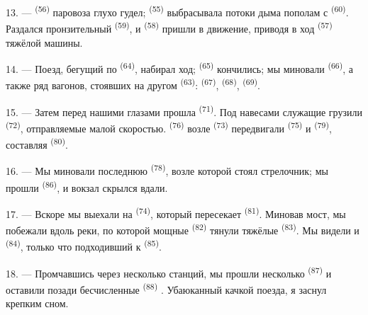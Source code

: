 13. ---  \textsuperscript{(56)} паровоза глухо гудел; 
\textsuperscript{(55)} выбрасывала потоки дыма пополам с 
\textsuperscript{(60)}. Раздался пронзительный  \textsuperscript{(59)}, и
 \textsuperscript{(58)} пришли в движение, приводя в ход
 \textsuperscript{(57)} тяжёлой машины.

\VUsaut{3.0mm}
\VUsaut{3.0mm}

14. --- Поезд, бегущий по  \textsuperscript{(64)}, набирал ход;
 \textsuperscript{(65)} кончились; мы миновали 
\textsuperscript{(66)}, а также ряд вагонов, стоявших на другом 
\textsuperscript{(63)}:  \textsuperscript{(67)},
 \textsuperscript{(68)}, 
\textsuperscript{(69)}.


15. --- Затем перед нашими глазами прошла 
\textsuperscript{(71)}. Под навесами служащие грузили 
\textsuperscript{(72)}, отправляемые малой скоростью. 
\textsuperscript{(76)} возле  \textsuperscript{(73)}
передвигали  \textsuperscript{(75)} и 
\textsuperscript{(79)}, составляя  \textsuperscript{(80)}.

16. --- Мы миновали последнюю  \textsuperscript{(78)}, возле
которой стоял стрелочник; мы прошли  \textsuperscript{(86)}, и
вокзал скрылся вдали.

17. --- Вскоре мы выехали на  \textsuperscript{(74)}, который
пересекает  \textsuperscript{(81)}. Миновав мост, мы побежали вдоль
реки, по которой мощные  \textsuperscript{(82)} тянули тяжёлые
 \textsuperscript{(83)}. Мы видели и 
\textsuperscript{(84)}, только что подходивший к  \textsuperscript{(85)}.

18. --- Промчавшись через несколько станций, мы прошли несколько
 \textsuperscript{(87)} и оставили позади бесчисленные 
\textsuperscript{(88)} . Убаюканный качкой поезда, я
заснул крепким сном.

